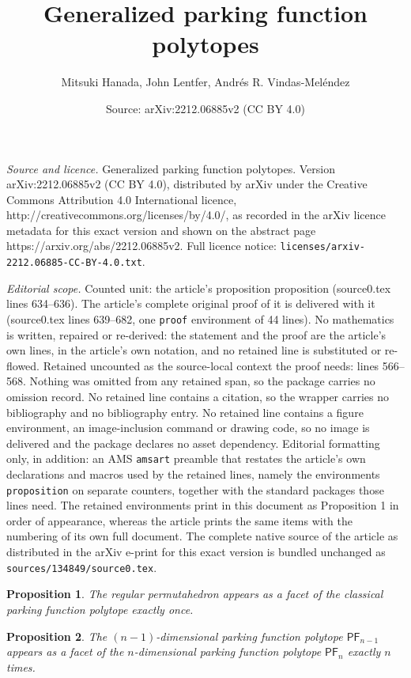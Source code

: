 \documentclass[10pt,a4paper]{amsart}
\title{Generalized parking function polytopes}
\author{Mitsuki Hanada, John Lentfer, Andr\'es R. Vindas-Mel\'endez}
\date{Source: arXiv:2212.06885v2 (CC BY 4.0)}
\newtheorem{proposition}{Proposition}
\newcommand{\PF}{\mathsf{PF}}
\begin{document}
\maketitle

\noindent\emph{Source and licence.} Generalized parking function polytopes. Version arXiv:2212.06885v2 (CC BY 4.0), distributed by arXiv under the Creative Commons Attribution 4.0 International licence, http://creativecommons.org/licenses/by/4.0/, as recorded in the arXiv licence metadata for this exact version and shown on the abstract page https://arxiv.org/abs/2212.06885v2. Full licence notice: \texttt{licenses/arxiv-2212.06885-CC-BY-4.0.txt}.\par\smallskip

\noindent\textit{Editorial scope.} Counted unit: the article's proposition proposition (source0.tex lines 634--636). The article's complete original proof of it is delivered with it (source0.tex lines 639--682, one \texttt{proof} environment of 44 lines). No mathematics is written, repaired or re-derived: the statement and the proof are the article's own lines, in the article's own notation, and no retained line is substituted or re-flowed.  Retained uncounted as the source-local context the proof needs: lines 566--568.  Nothing was omitted from any retained span, so the package carries no omission record.  No retained line contains a citation, so the wrapper carries no bibliography and no bibliography entry.  No retained line contains a figure environment, an image-inclusion command or drawing code, so no image is delivered and the package declares no asset dependency.  Editorial formatting only, in addition: an AMS \texttt{amsart} preamble that restates the article's own declarations and macros used by the retained lines, namely the environments \texttt{proposition} on separate counters, together with the standard packages those lines need.  The retained environments print in this document as Proposition 1 in order of appearance, whereas the article prints the same items with the numbering of its own full document.  The complete native source of the article as distributed in the arXiv e-print for this exact version is bundled unchanged as \texttt{sources/134849/source0.tex}.
\begin{proposition}\label{prop:permutahedron}
The regular permutahedron appears as a facet of the classical parking function polytope exactly once. 
\end{proposition}

\begin{proposition}
The $(n-1)$-dimensional parking function polytope $\PF_{n-1}$ appears as a facet of the $n$-dimensional parking function polytope $\PF_n$ exactly $n$ times.
\end{proposition}
\end{document}
